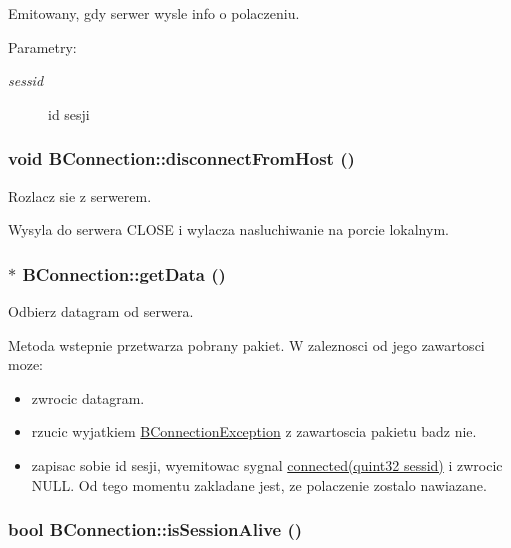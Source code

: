 Emitowany, gdy serwer wysle info o polaczeniu. 

\begin{Desc}
\item[Parametry:]
\begin{description}
\item[{\em sessid}]id sesji \end{description}
\end{Desc}
\hypertarget{class_b_connection_9035d3ca3836f1c841e0f91327753f14}{
\subsubsection[{disconnectFromHost}]{\setlength{\rightskip}{0pt plus 5cm}void BConnection::disconnectFromHost ()}}
\label{class_b_connection_9035d3ca3836f1c841e0f91327753f14}


Rozlacz sie z serwerem. 

Wysyla do serwera CLOSE i wylacza nasluchiwanie na porcie lokalnym. \hypertarget{class_b_connection_68fb4ff5ee98e5228378d08a2fe2ae19}{
\subsubsection[{getData}]{ $\ast$ BConnection::getData ()}}
\label{class_b_connection_68fb4ff5ee98e5228378d08a2fe2ae19}


Odbierz datagram od serwera. 

Metoda wstepnie przetwarza pobrany pakiet. W zaleznosci od jego zawartosci moze: \begin{itemize}
\item zwrocic datagram. \item rzucic wyjatkiem \hyperlink{class_b_connection_exception}{BConnectionException} z zawartoscia pakietu badz nie. \item zapisac sobie id sesji, wyemitowac sygnal \hyperlink{class_b_connection_90dca3f0343427e31bb4544a8accf56d}{connected(quint32 sessid)} i zwrocic NULL. Od tego momentu zakladane jest, ze polaczenie zostalo nawiazane. \end{itemize}
\hypertarget{class_b_connection_5a4985b2a3f559b448ce6660ba353acb}{
\subsubsection[{isSessionAlive}]{\setlength{\rightskip}{0pt plus 5cm}bool BConnection::isSessionAlive ()}}
\label{class_b_connection_5a4985b2a3f559b448ce6660ba353acb}


